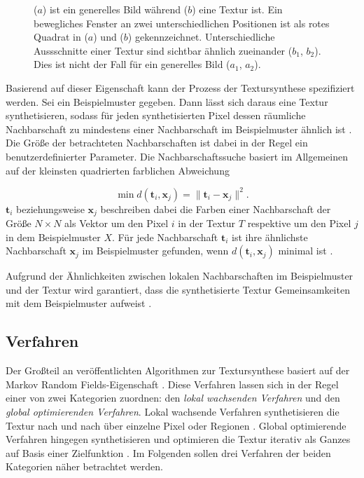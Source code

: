 \begin{figure}
\begin{subfigure}{0.45\textwidth}
	\end{subfigure}
	
	\caption{
		($a$) ist ein generelles Bild während ($b$) eine Textur ist.
		Ein bewegliches Fenster an zwei unterschiedlichen Positionen ist als rotes Quadrat in ($a$) und ($b$) gekennzeichnet.
		Unterschiedliche Aussschnitte einer Textur sind sichtbar ähnlich zueinander ($b_1$, $b_2$).
		Dies ist nicht der Fall für ein generelles Bild ($a_1$, $a_2$).
	}
	\label{mrf}
\end{figure}

Basierend auf dieser Eigenschaft kann der Prozess der Textursynthese spezifiziert werden.
Sei ein Beispielmuster gegeben.
Dann lässt sich daraus eine Textur synthetisieren, sodass für jeden synthetisierten Pixel dessen räumliche Nachbarschaft zu mindestens einer Nachbarschaft im Beispielmuster ähnlich ist \cite{StateOfTheArt}.
Die Größe der betrachteten Nachbarschaften ist dabei in der Regel ein benutzerdefinierter Parameter.
Die Nachbarschaftssuche basiert im Allgemeinen auf der kleinsten quadrierten farblichen Abweichung 

\begin{equation}
	\label{nachbarschaftssuche}
	\min d(\textbf{t}_i, \textbf{x}_j) = \lVert \textbf{t}_i - \textbf{x}_j \rVert^2\text{.}
\end{equation}
$\textbf{t}_i$ beziehungsweise $\textbf{x}_j$ beschreiben dabei die Farben einer Nachbarschaft der Größe $N \times N$ als Vektor um den Pixel $i$ in der Textur $T$ respektive um den Pixel $j$ in dem Beispielmuster $X$.
Für jede Nachbarschaft $\textbf{t}_i$ ist ihre ähnlichste Nachbarschaft $\textbf{x}_j$ im Beispielmuster gefunden, wenn $d(\textbf{t}_i, \textbf{x}_j)$ minimal ist \cite{TextureOptimization}.

Aufgrund der Ähnlichkeiten zwischen lokalen Nachbarschaften im Beispielmuster und der Textur wird garantiert, dass die synthetisierte Textur Gemeinsamkeiten mit dem Beispielmuster aufweist \cite{StateOfTheArt}.

\subsection{Verfahren}

Der Großteil an veröffentlichten Algorithmen zur Textursynthese basiert auf der \glqq Markov Random Fields\grqq -Eigenschaft \cite{StateOfTheArt}.
Diese Verfahren lassen sich in der Regel einer von zwei Kategorien zuordnen: den \emph{lokal wachsenden Verfahren} und den \emph{global optimierenden Verfahren}.
Lokal wachsende Verfahren synthetisieren die Textur nach und nach über einzelne Pixel oder Regionen \cite{TextureOptimization}.
Global optimierende Verfahren hingegen synthetisieren und optimieren die Textur iterativ als Ganzes auf Basis einer Zielfunktion \cite{SelfTuning}.
Im Folgenden sollen drei Verfahren der beiden Kategorien näher betrachtet werden.

